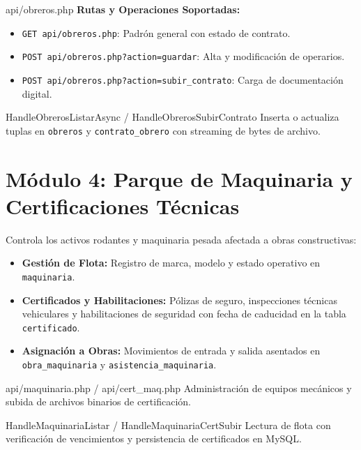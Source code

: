 \documentclass[11pt,a4paper,openany]{report}
\begin{document}
\begin{apibox}{api/obreros.php}
    \textbf{Rutas y Operaciones Soportadas:}
    \begin{itemize}[leftmargin=1.2em, topsep=2pt, itemsep=1pt]
        \item \texttt{GET api/obreros.php}: Padrón general con estado de contrato.
        \item \texttt{POST api/obreros.php?action=guardar}: Alta y modificación de operarios.
        \item \texttt{POST api/obreros.php?action=subir\_contrato}: Carga de documentación digital.
    \end{itemize}
\end{apibox}

\begin{methodbox}{HandleObrerosListarAsync / HandleObrerosSubirContrato}
    Inserta o actualiza tuplas en \texttt{obreros} y \texttt{contrato\_obrero} con streaming de bytes de archivo.
\end{methodbox}

\electricsep

\section{Módulo 4: Parque de Maquinaria y Certificaciones Técnicas}

Controla los activos rodantes y maquinaria pesada afectada a obras constructivas:
\begin{itemize}[leftmargin=1.5em]
    \item \textbf{Gestión de Flota:} Registro de marca, modelo y estado operativo en \texttt{maquinaria}.
    \item \textbf{Certificados y Habilitaciones:} Pólizas de seguro, inspecciones técnicas vehiculares y habilitaciones de seguridad con fecha de caducidad en la tabla \texttt{certificado}.
    \item \textbf{Asignación a Obras:} Movimientos de entrada y salida asentados en \texttt{obra\_maquinaria} y \texttt{asistencia\_maquinaria}.
\end{itemize}

\begin{apibox}{api/maquinaria.php / api/cert\_maq.php}
    Administración de equipos mecánicos y subida de archivos binarios de certificación.
\end{apibox}

\begin{methodbox}{HandleMaquinariaListar / HandleMaquinariaCertSubir}
    Lectura de flota con verificación de vencimientos y persistencia de certificados en MySQL.
\end{methodbox}
\end{document}
